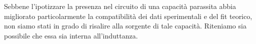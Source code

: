 Sebbene l'ipotizzare la presenza nel circuito di una capacità parassita abbia migliorato particolarmente la compatibilità dei dati sperimentali e del fit teorico, non siamo stati in grado di risalire alla sorgente di tale capacità. Riteniamo sia possibile che essa sia interna all'induttanza.







